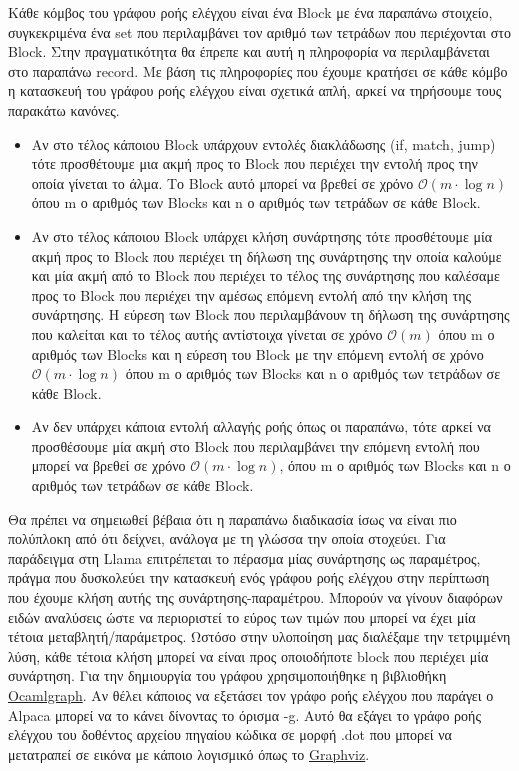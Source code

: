\documentclass[12pt]{article}
\newcommand{\Llama}{\textsf{Llama }}
\begin{document}
Κάθε κόμβος του γράφου ροής ελέγχου είναι ένα Block με ένα παραπάνω στοιχείο, συγκεκριμένα ένα set που περιλαμβάνει τον αριθμό των τετράδων που περιέχονται στο Block. Στην πραγματικότητα θα έπρεπε και αυτή η πληροφορία να περιλαμβάνεται στο παραπάνω record. Με βάση τις πληροφορίες που έχουμε κρατήσει σε κάθε κόμβο η κατασκευή του γράφου ροής ελέγχου είναι σχετικά απλή, αρκεί να τηρήσουμε τους παρακάτω κανόνες.
\begin{itemize}
\item Αν στο τέλος κάποιου Block υπάρχουν εντολές διακλάδωσης (if, match, jump) τότε προσθέτουμε μια ακμή προς το Block που περιέχει την εντολή προς την οποία γίνεται το άλμα. Το Block αυτό μπορεί να βρεθεί σε χρόνο $\mathcal{O}(m \cdot \log n)$ όπου m ο αριθμός των Blocks και n ο αριθμός των τετράδων σε κάθε Block.
\item Αν στο τέλος κάποιου Block υπάρχει κλήση συνάρτησης τότε προσθέτουμε μία ακμή προς το Block που περιέχει τη δήλωση της συνάρτησης την οποία καλούμε και μία ακμή από το Block που περιέχει το τέλος της συνάρτησης που καλέσαμε προς το Block που περιέχει την αμέσως επόμενη εντολή από την κλήση της συνάρτησης. Η εύρεση των Block που περιλαμβάνουν τη δήλωση της συνάρτησης που καλείται και το τέλος αυτής αντίστοιχα γίνεται σε χρόνο $\mathcal{O}(m)$ όπου m ο αριθμός των Blocks και η εύρεση του Block με την επόμενη εντολή σε χρόνο $\mathcal{O}(m \cdot \log n)$ όπου m ο αριθμός των Blocks και n ο αριθμός των τετράδων σε κάθε Block.
\item Αν δεν υπάρχει κάποια εντολή αλλαγής ροής όπως οι παραπάνω, τότε αρκεί να προσθέσουμε μία ακμή στο Block που περιλαμβάνει την επόμενη εντολή που μπορεί να βρεθεί σε χρόνο $\mathcal{O}(m \cdot \log n)$, όπου m ο αριθμός των Blocks και n ο αριθμός των τετράδων σε κάθε Block.
\end{itemize}
Θα πρέπει να σημειωθεί βέβαια ότι η παραπάνω διαδικασία ίσως να είναι πιο πολύπλοκη από ότι δείχνει, ανάλογα με τη γλώσσα την οποία στοχεύει. Για παράδειγμα στη \Llama επιτρέπεται το πέρασμα μίας συνάρτησης ως παραμέτρος, πράγμα που δυσκολεύει την κατασκευή ενός γράφου ροής ελέγχου στην περίπτωση που έχουμε κλήση αυτής της συνάρτησης-παραμέτρου. Μπορούν να γίνουν διαφόρων ειδών αναλύσεις ώστε να περιοριστεί το εύρος των τιμών που μπορεί να έχει μία τέτοια μεταβλητή/παράμετρος. Ωστόσο στην υλοποίηση μας διαλέξαμε την τετριμμένη λύση, κάθε τέτοια κλήση μπορεί να είναι προς οποιοδήποτε block που περιέχει μία συνάρτηση. 
Για την δημιουργία του γράφου χρησιμοποιήθηκε η βιβλιοθήκη \href{http://ocamlgraph.lri.fr}{Ocamlgraph}. Αν θέλει κάποιος να εξετάσει τον γράφο ροής ελέγχου που παράγει ο Alpaca μπορεί να το κάνει δίνοντας το όρισμα -g. Αυτό θα εξάγει το γράφο ροής ελέγχου του δοθέντος αρχείου πηγαίου κώδικα σε μορφή .dot που μπορεί να μετατραπεί σε εικόνα με κάποιο λογισμικό όπως το \href{http://graphviz.org}{Graphviz}. 
\end{document}

